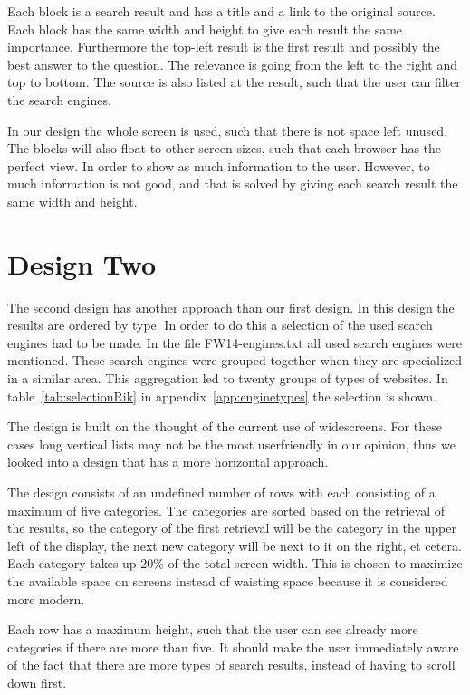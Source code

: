 \documentclass[12pt]{article}
\begin{document}
Each block is a search result and has a title and a link to the original source. Each block has the same width and height to give each result the same importance. Furthermore the top-left result is the first result and possibly the best answer to the question. The relevance is going from the left to the right and top to bottom. The source is also listed at the result, such that the user can filter the search engines. 

In our design the whole screen is used, such that there is not space left unused. The blocks will also float to other screen sizes, such that each browser has the perfect view. In order to show as much information to the user. However, to much information is not good, and that is solved by giving each search result the same width and height. 

\section{Design Two}
\label{sec:layoutRik}
The second design has another approach than our first design.
In this design the results are ordered by type.
In order to do this a selection of the used search engines had to be made.
In the file FW14-engines.txt all used search engines were mentioned.
These search engines were grouped together when they are specialized in a similar area.
This aggregation led to twenty groups of types of websites.
In table~\ref{tab:selectionRik} in appendix~\ref{app:enginetypes} the selection is shown.

The design is built on the thought of the current use of widescreens.
For these cases long vertical lists may not be the most userfriendly in our opinion, thus we looked into a design that has a more horizontal approach.

The design consists of an undefined number of rows with each consisting of a maximum of five categories.
The categories are sorted based on the retrieval of the results, so the category of the first retrieval will be the category in the upper left of the display, the next new category will be next to it on the right, et cetera.
Each category takes up 20\% of the total screen width.
This is chosen to maximize the available space on screens instead of waisting space because it is considered more modern.

Each row has a maximum height, such that the user can see already more categories if there are more than five.
It should make the user immediately aware of the fact that there are more types of search results, instead of having to scroll down first.
\end{document}
